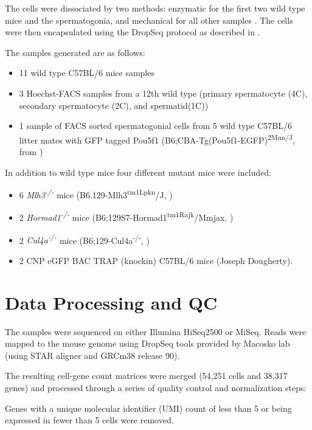 The cells were dissociated by two methods: enzymatic for the first two wild type mice and the spermatogonia, and mechanical for all other samples \parencite{Lima2017Standardized,Jung2019Unified}.
The cells were then encapsulated using the DropSeq protocol \parencite{Macosko2015Highly} as described in \cite{Jung2019Unified}.

The samples generated are as follows:

\begin{itemize}
	\item 11 wild type C57BL/6 mice samples
	\item 3 Hoechst-FACS samples from a 12th wild type (primary spermatocyte (4C), secondary spermatocyte (2C), and spermatid(1C))
	\item 1 sample of FACS sorted spermatogonial cells from 5 wild type C57BL/6 litter mates with GFP tagged Pou5f1 (B6;CBA-Tg(Pou5f1-EGFP)\textsuperscript{2Mnn/J}, from \cite{Szabo2002Allelespecific})
\end{itemize}

In addition to wild type mice four different mutant mice were included:
\begin{itemize}
	\item 6 \textit{Mlh3\textsuperscript{-/-}} mice (B6.129-Mlh3\textsuperscript{tm1Lpkn}/J, \cite{Lipkin2002Meiotic})
	\item 2 \textit{Hormad1\textsuperscript{-/-}} mice (B6;129S7-Hormad1\textsuperscript{tm1Rajk}/Mmjax, \cite{Shin2010Hormad1})
	\item 2 \textit{Cul4a\textsuperscript{-/-}} mice (B6;129-Cul4a\textsuperscript{-/-}, \cite{Yin2011E3})
	\item 2 CNP eGFP BAC TRAP (knockin) C57BL/6 mice (Joseph Dougherty).
\end{itemize}


\section{Data Processing and QC}

The samples were sequenced on either Illumina HiSeq2500 or MiSeq.
Reads were mapped to the mouse genome using DropSeq tools provided by Macosko lab (using STAR aligner and GRCm38 release 90).

The resulting cell-gene count matrices were merged (54,251 cells and 38,317 genes) and processed through a series of quality control and normalization steps:

Genes with a unique molecular identifier (UMI) count of less than 5 or being expressed in fewer than 5 cells were removed.


